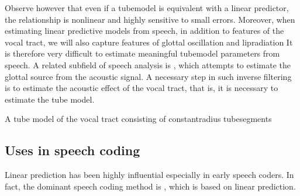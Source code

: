 \documentclass[letterpaper,10pt,english]{jupyterBook}
\begin{document}
\sphinxAtStartPar
Observe however that even if a tube\sphinxhyphen{}model is equivalent with a linear
predictor, the relationship is non\sphinxhyphen{}linear and highly sensitive to small
errors. Moreover, when estimating linear predictive models from speech,
in addition to features of the vocal tract, we will also capture
features of glottal oscillation and lip\sphinxhyphen{}radiation It is therefore very
difficult to estimate meaningful tube\sphinxhyphen{}model parameters from speech. A
related sub\sphinxhyphen{}field of speech analysis is , which attempts to estimate the
glottal source from the acoustic signal. A necessary step in such
inverse filtering is to estimate the acoustic effect of the vocal tract,
that is, it is necessary to estimate the tube model.

\sphinxAtStartPar
A tube model of the vocal tract consisting of constant\sphinxhyphen{}radius
tube\sphinxhyphen{}segments

\sphinxAtStartPar
{}


\subsection{Uses in speech coding}
\label{\detokenize{Representations/Linear_prediction:uses-in-speech-coding}}
\sphinxAtStartPar
Linear prediction has been highly influential especially in early speech
coders. In fact, the dominant speech coding method is , which
is based on linear prediction.
\end{document}

